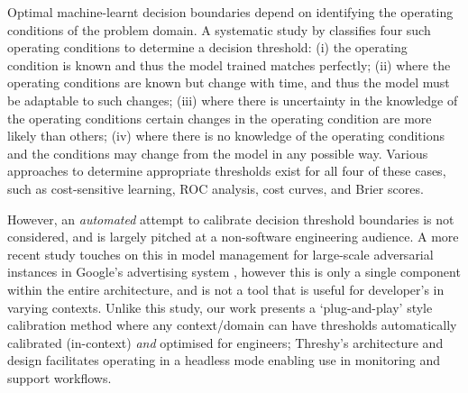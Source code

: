 
Optimal machine-learnt decision boundaries depend on identifying the operating conditions of the problem domain. A systematic study by \citet{Drummond2006} classifies four such operating conditions to determine a decision threshold: (i) the operating condition is known and thus the model trained matches perfectly; (ii) where the operating conditions are known but change with time, and thus the model must be adaptable to such changes; (iii) where there is uncertainty in the knowledge of the operating conditions certain changes in the operating condition are more likely than others; (iv) where there is no knowledge of the operating conditions and the conditions may change from the model in any possible way. Various approaches to determine appropriate thresholds exist for all four of these cases, such as cost-sensitive learning, ROC analysis, cost curves, and Brier scores.

However, an \textit{automated} attempt to calibrate decision threshold boundaries is not considered, and is largely pitched at a non-software engineering audience. A more recent study touches on this in model management for large-scale adversarial instances in Google's advertising system \citep{sculley2011detecting}, however this is only a single component within the entire architecture, and is not a tool that is useful for developer's in varying contexts. Unlike this study, our work presents a `plug-and-play' style calibration method where any context/domain can have thresholds automatically calibrated (in-context) \textit{and} optimised for engineers; Threshy’s architecture and design facilitates operating in a headless mode enabling use in monitoring and support workflows.


